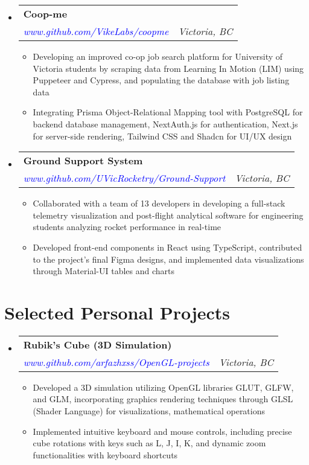 \documentclass[a4paper,10pt]{article}
\makeatletter
\newcommand{\resumeItemDot}[1]
{\item \normalsize{#1}}
\newcommand{\resumeSubheading}[4]{
  \item
    \begin{tabular*}{\dimexpr\textwidth-1.2em\relax}{@{}l@{\extracolsep{\fill}}r@{}}
      \large \textbf{#1} & \fontsize{11}{12}\selectfont \text{#2} \\
      \textit{#3} & \textit{#4} \\
    \end{tabular*}\vspace{-2pt}
}
\newenvironment{resumeSubHeadingListStart}
{\begin{itemize}[leftmargin=0.10in, label={}]}
{\end{itemize}}
\newenvironment{resumeItemListStart}
{\begin{itemize}[leftmargin=0.15in, label={$\bullet$}]}
{\end{itemize}}
\makeatother
\begin{document}
\begin{resumeSubHeadingListStart}
\resumeSubheading
    {Coop-me}
    {Dec 2023 – Present}
    {\textcolor{blue}{www.github.com/VikeLabs/coopme}}
    {Victoria, BC}
\begin{resumeItemListStart}
    \resumeItemDot{Developing an improved co-op job search platform for University of Victoria students by scraping data from Learning In Motion (LIM) using Puppeteer and Cypress, and populating the database with job listing data}
    \resumeItemDot{Integrating Prisma Object-Relational Mapping tool with PostgreSQL for backend database management, NextAuth.js for authentication, Next.js for server-side rendering, Tailwind CSS and Shadcn for UI/UX design}
\end{resumeItemListStart}
\end{resumeSubHeadingListStart}

\begin{resumeSubHeadingListStart}
\resumeSubheading
    {Ground Support System}
    {Jul 2023 – Jan 2024}
    {\textcolor{blue}{www.github.com/UVicRocketry/Ground-Support}}
    {Victoria, BC}
\begin{resumeItemListStart}
    \resumeItemDot{Collaborated with a team of 13 developers in developing a full-stack telemetry visualization and post-flight analytical software for engineering students analyzing rocket performance in real-time}
    \resumeItemDot{Developed front-end components in React using TypeScript, contributed to the project’s final Figma designs, and implemented data visualizations through Material-UI tables and charts}
\end{resumeItemListStart}
\end{resumeSubHeadingListStart}

\section{Selected Personal Projects}
\begin{resumeSubHeadingListStart}
\resumeSubheading
    {Rubik’s Cube (3D Simulation)}{Feb 2023 – June 2023}
    {\textcolor{blue}{www.github.com/arfazhxss/OpenGL-projects}}
    {Victoria, BC}
\begin{resumeItemListStart}
    \resumeItemDot{Developed a 3D simulation utilizing OpenGL libraries GLUT, GLFW, and GLM, incorporating graphics rendering techniques through GLSL (Shader Language) for visualizations, mathematical operations}
    \resumeItemDot{Implemented intuitive keyboard and mouse controls, including precise cube rotations with keys such as L, J, I, K, and dynamic zoom functionalities with keyboard shortcuts}
\end{resumeItemListStart}
\end{resumeSubHeadingListStart}
\end{document}
